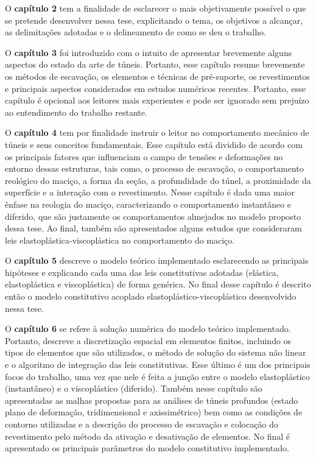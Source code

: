 O \textbf{capítulo 2} tem a finalidade de esclarecer o mais objetivamente possível o que se pretende desenvolver nessa tese, explicitando o tema, os objetivos a alcançar, as delimitações  adotadas e o delineamento de como se deu o trabalho.

O \textbf{capítulo 3} foi introduzido com o intuito de apresentar brevemente alguns aspectos do estado da arte de túneis. Portanto, esse capítulo resume brevemente os métodos de escavação, os elementos e técnicas de pré-suporte, os revestimentos e principais aspectos considerados em estudos numéricos recentes. Portanto, esse capítulo é opcional aos leitores mais experientes e pode ser ignorado sem prejuízo ao entendimento do trabalho restante.

O \textbf{capítulo 4} tem por finalidade instruir o leitor no comportamento mecânico de túneis e seus conceitos fundamentais. Esse capítulo está dividido de acordo com os principais fatores que influenciam o campo de tensões e deformações no entorno dessas estruturas, tais como, o processo de escavação, o comportamento reológico do maciço, a forma da seção, a profundidade do túnel, a proximidade da superfície e a interação com o revestimento. Nesse capítulo é dada uma maior ênfase na reologia do maciço, caracterizando o comportamento instantâneo e diferido, que são justamente os comportamentos almejados no modelo proposto dessa tese. Ao final, também são apresentados alguns estudos que consideraram leis elastoplástica-viscoplástica no comportamento do maciço.

O \textbf{capítulo 5} descreve o modelo teórico implementado esclarecendo as principais hipóteses e explicando cada uma das leis constitutivas adotadas (elástica, elastoplástica e viscoplástica) de forma genérica. No final desse capítulo é descrito então o modelo constitutivo acoplado elastoplástico-viscoplástico desenvolvido nessa tese.

O \textbf{capítulo 6} se refere à solução numérica do modelo teórico implementado. Portanto, descreve a discretização espacial em elementos finitos, incluindo os tipos de elementos que são utilizados, o método de solução do sistema não linear e o algoritmo de integração das leis constitutivas. Esse último é um dos principais focos do trabalho, uma vez que nele é feita a junção entre o modelo elastoplástico (instantâneo) e o viscoplástico (diferido). Também nesse capítulo são apresentadas as malhas propostas para as análises de túneis profundos (estado plano de deformação, tridimensional e axissimétrico) bem como as condições de contorno utilizadas e a descrição do processo de escavação e colocação do revestimento pelo método da ativação e desativação de elementos. No final é apresentado os principais parâmetros do modelo constitutivo implementado.


